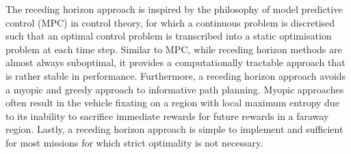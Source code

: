 \documentclass{article}
\begin{document}
	The receding horizon approach is inspired by the philosophy of model predictive control (MPC) in control theory, for which a continuous problem is discretised such that an optimal control problem is transcribed into a static optimisation problem at each time step. Similar to MPC, while receding horizon methods are almost always suboptimal, it provides a computationally tractable approach that is rather stable in performance. Furthermore, a receding horizon approach avoids a myopic and greedy approach to informative path planning. Myopic approaches often result in the vehicle fixating on a region with local maximum entropy due to its inability to sacrifice immediate rewards for future rewards in a faraway region. Lastly, a receding horizon approach is simple to implement and sufficient for most missions for which strict optimality is not necessary.
	
\end{document}
